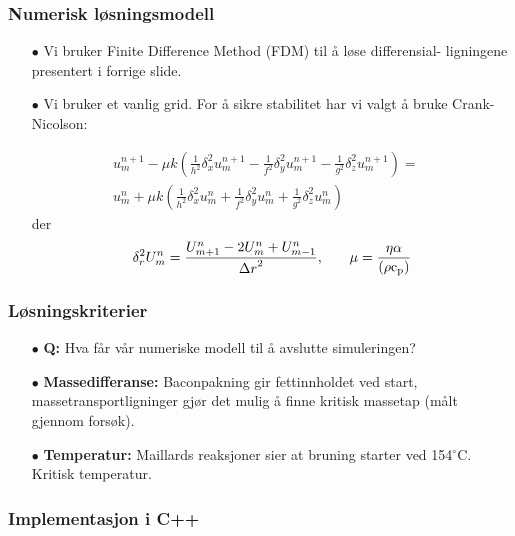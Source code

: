 \documentclass[screen]{beamer}
\begin{document}
\begin{frame}
  \frametitle{Numerisk løsningsmodell}
  \begin{itemize}
    \item[$\bullet$] Vi bruker Finite Difference Method (FDM) til å løse differensial-
ligningene presentert i forrige slide.

\item[$\bullet$] Vi bruker et vanlig grid. For å sikre stabilitet har vi valgt
å bruke Crank-Nicolson:

\begin{eqnarray*}
u_m^{n+1}-\mu k(\frac{1}{h^2}\delta_x^2 u_m^{n+1}-\frac{1}{f^2}\delta_y^2 u_m^{n+1}-\frac{1}{g^2}\delta_z^2 u_m^{n+1})= &  \\
u_m^n + \mu k(\frac{1}{h^2}\delta_x^2 u_m^n + \frac{1}{f^2}\delta_y^2 u_m^n +\frac{1}{g^2}\delta_z^2 u_m^n)&
\end{eqnarray*}
der
\begin{equation*}
\delta_{r}^{2}U_m^{n}=\frac{U_{m+1}^{n}-2U_m^{n}+U_{m-1}^{n}}{{\Delta r}^{2}} \rm{,} \quad \quad \mu =\frac{\eta\alpha}{(\rho c_p)}
\end{equation*}


  \end{itemize}
\end{frame}

\begin{frame}
  \frametitle{Løsningskriterier}
  \begin{center}
  \begin{itemize}  
    \item[$\bullet$] \textbf{Q:} Hva får vår numeriske modell
      til å avslutte simuleringen?

    \item[$\bullet$] \textbf{Massedifferanse:} Baconpakning gir fettinnholdet ved start,
  massetransportligninger gjør det mulig å finne kritisk massetap (målt gjennom forsøk).

\item[$\bullet$] \textbf{Temperatur:} Maillards reaksjoner sier at bruning starter ved
  154$^{\circ}$C. Kritisk temperatur.
  \end{itemize}
  \end{center}
\end{frame}

\begin{frame}
  \frametitle{Implementasjon i C++}
	
\end{frame}
\end{document}
